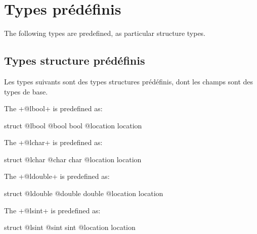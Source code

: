 
\chapter{Types prédéfinis}

The following types are predefined, as particular structure types.

\section{Types structure prédéfinis}

Les types suivants sont des types structures prédéfinis, dont les champs sont des types de base.
 

The \ggs+@lbool+ is predefined as:
\begin{galgascode}
struct @lbool {
  @bool bool
  @location location
}
\end{galgascode}





The \ggs+@lchar+ is predefined as:
\begin{galgascode}
struct @lchar {
  @char char
  @location location
}
\end{galgascode}








The \ggs+@ldouble+ is predefined as:
\begin{galgascode}
struct @ldouble {
  @double double
  @location location
}
\end{galgascode}








The \ggs+@lsint+ is predefined as:
\begin{galgascode}
struct @lsint {
  @sint sint
  @location location
}
\end{galgascode}








